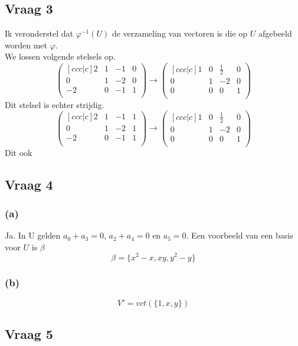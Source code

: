 \documentclass[lineaire_algebra_oplossingen.tex]{subfiles}
\begin{document}
\subsection{Vraag 3}
Ik veronderstel dat $\varphi^{-1}(U)$ de verzameling van vectoren is die op $U$ afgebeeld worden met $\varphi$.\\
We lossen volgende stelsels op.
\[
\begin{pmatrix}[c c c | c]
2 & 1 & -1 & 0\\
0 & 1 & -2 & 0\\
-2 & 0 &-1 & 1\\
\end{pmatrix}
\rightarrow
\begin{pmatrix}[c c c | c]
1 & 0 & \frac{1}{2} & 0\\
0 & 1 & -2 & 0\\
0 & 0 & 0 & 1\\
\end{pmatrix}
\]
Dit stelsel is echter strijdig. %
\[
\begin{pmatrix}[c c c | c]
2 & 1 & -1 & 1\\
0 & 1 & -2 & 1\\
-2 & 0 &-1 & 1\\
\end{pmatrix}
\rightarrow
\begin{pmatrix}[c c c | c]
1 & 0 & \frac{1}{2} & 0\\
0 & 1 & -2 & 0\\
0 & 0 & 0 & 1\\
\end{pmatrix}
\]
Dit ook %


\subsection{Vraag 4}
\subsubsection*{(a)}
Ja. In U gelden $a_0+a_3=0$, $a_2+a_4=0$ en $a_5=0$.
Een voorbeeld van een basis voor $U$ is $\beta$
\[
\beta = \{x^2-x,xy,y^2-y\}
\]

\subsubsection*{(b)}
\[
V' = vct(\{1,x,y\})
\]

\subsection{Vraag 5}
\end{document}
